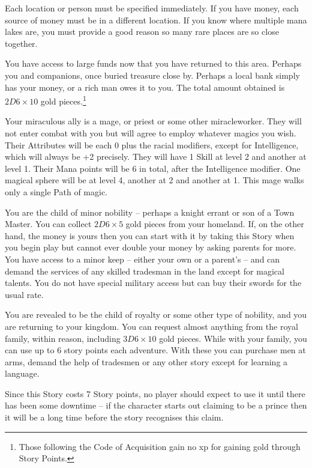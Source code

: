 \begin{multicols}{2}
Each location or person must be specified immediately.
If you have money, each source of money must be in a different location.
If you know where multiple mana lakes are, you must provide a good reason so many rare places are so close together.

You have access to large funds now that you have returned to this area.
Perhaps you and companions, once buried treasure close by.
Perhaps a local bank simply has your money, or a rich man owes it to you.
The total amount obtained is $2D6 \times 10$ gold pieces.\footnote{Those following the Code of Acquisition gain no \gls{xp} for gaining gold through Story Points.}

Your miraculous ally is a mage, or priest or some other \gls{miracleworker}. They will not enter combat with you but will agree to employ whatever magics you wish. Their Attributes will be each 0 plus the racial modifiers, except for Intelligence, which will always be +2 precisely. They will have 1 Skill at level 2 and another at level 1. Their Mana points will be 6 in total, after the Intelligence modifier. One magical sphere will be at level 4, another at 2 and another at 1. This mage walks only a single Path of magic.

You are the child of minor nobility -- perhaps a knight errant or son of a Town Master.
You can collect $2D6 \times 5$ gold pieces from your homeland.
If, on the other hand, the money is yours then you can start with it by taking this Story when you begin play but cannot ever double your money by asking parents for more.
You have access to a minor keep -- either your own or a parent's -- and can demand the services of any skilled tradesman in the land except for magical talents.
You do not have special military access but can buy their swords for the usual rate.

You are revealed to be the child of royalty or some other type of nobility, and you are returning to your kingdom.
You can request almost anything from the royal family, within reason, including $3D6 \times 10$ gold pieces.
While with your family, you can use up to 6 story points each adventure. With these you can purchase men at arms, demand the help of tradesmen or any other story except for learning a language.

Since this Story costs 7 Story points, no player should expect to use it until there has been some downtime -- if the character starts out claiming to be a prince then it will be a long time before the story recognises this claim.

\end{multicols}

